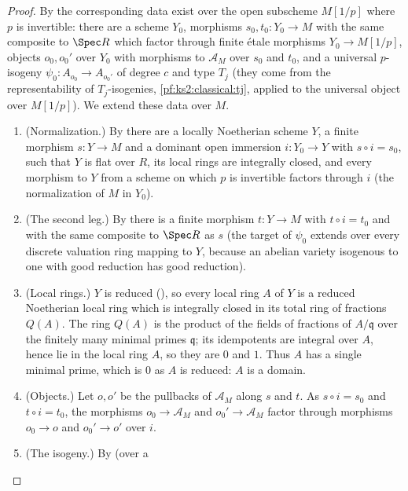 \begin{proof}
By  the corresponding data exist over
the open subscheme $M[1/p]$ where $p$ is invertible: there are a scheme $Y_0$, morphisms
$s_0,t_0\colon Y_0\to M$ with the same composite to $\Spec R$ which factor through finite \'etale
morphisms $Y_0\to M[1/p]$, objects $o_0,o_0'$ over $Y_0$ with morphisms to $\mathcal A_M$ over $s_0$
and $t_0$, and a universal $p$-isogeny $\psi_0\colon A_{o_0}\to A_{o_0'}$ of degree $c$ and type $T_j$
(they come from the representability of $T_j$-isogenies, \cref{pf:ks2:classical:tj}, applied to the
universal object over $M[1/p]$). We extend these data over $M$.
\begin{enumerate}
\item (Normalization.) By 
  there are a locally Noetherian scheme $Y$, a finite morphism $s\colon Y\to M$ and a dominant open
  immersion $i\colon Y_0\to Y$ with $s\circ i=s_0$, such that $Y$ is flat over $R$, its local rings
  are integrally closed, and every morphism to $Y$ from a scheme on which $p$ is invertible factors
  through $i$ (the normalization of $M$ in $Y_0$).
\item (The second leg.) By  there is a finite
  morphism $t\colon Y\to M$ with $t\circ i=t_0$ and with the same composite to $\Spec R$ as $s$ (the
  target of $\psi_0$ extends over every discrete valuation ring mapping to $Y$, because an abelian
  variety isogenous to one with good reduction has good reduction).
\item (Local rings.) $Y$ is reduced
  (), so every local ring $A$ of
  $Y$ is a reduced Noetherian local ring which is integrally closed in its total ring of fractions
  $Q(A)$. The ring $Q(A)$ is the product of the fields of fractions of $A/\mathfrak q$ over the
  finitely many minimal primes $\mathfrak q$; its idempotents are integral over $A$, hence lie in the
  local ring $A$, so they are $0$ and $1$. Thus $A$ has a single minimal prime, which is $0$ as $A$ is
  reduced: $A$ is a domain.
\item (Objects.) Let $o,o'$ be the pullbacks of $\mathcal A_M$ along $s$ and $t$. As $s\circ
  i=s_0$ and $t\circ i=t_0$, the
  morphisms $o_0\to\mathcal A_M$ and $o_0'\to\mathcal A_M$ factor through morphisms $o_0\to o$ and
  $o_0'\to o'$ over $i$.
\item (The isogeny.) By  (over a

\end{enumerate}
\end{proof}
